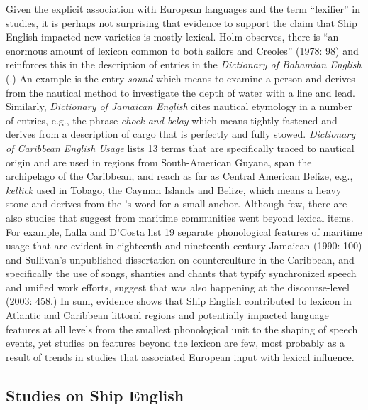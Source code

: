 Given the explicit association with  European languages and the term “lexifier” in  studies, it is perhaps not surprising that evidence to support the claim that Ship English impacted new varieties is mostly lexical. Holm observes, there is “an enormous amount of lexicon common to both sailors and Creoles” (1978: 98) and reinforces this in the description of entries in the \textit{Dictionary of Bahamian English} (\citealt{HolmWattSchilling1982}.) An example is the entry \textit{sound} which means to examine a person and derives from the nautical method to investigate the depth of water with a line and lead. Similarly,  \textit{Dictionary of Jamaican English} cites nautical etymology in a number of entries, e.g., the phrase \textit{chock and belay} which means tightly fastened and derives from a description of cargo that is perfectly and fully stowed.  \textit{Dictionary of Caribbean English Usage} lists 13 terms that are specifically traced to nautical origin and are used in regions from South-American Guyana, span the archipelago of the Caribbean, and reach as far as Central American Belize, e.g., \textit{kellick} used in Tobago, the Cayman Islands and Belize, which means a heavy stone and derives from the ’s word for a small anchor. Although few, there are also studies that suggest  from maritime communities went beyond lexical items. For example, Lalla and D’Costa list 19 separate phonological features of maritime usage that are evident in eighteenth and nineteenth century Jamaican  (1990: 100) and Sullivan’s unpublished dissertation on  counterculture in the Caribbean, and specifically the use of songs, shanties and chants that typify synchronized speech and unified work efforts, suggest that  was also happening at the discourse-level (2003: 458.) In sum, evidence shows that Ship English contributed to lexicon in Atlantic and Caribbean littoral regions and potentially impacted language features at all levels from the smallest phonological unit to the shaping of speech events, yet studies on features beyond the lexicon are few, most probably as a result of trends in  studies that associated European input with lexical influence.  

\subsection{{Studies on Ship English}}\label{sec:2.1.2}

